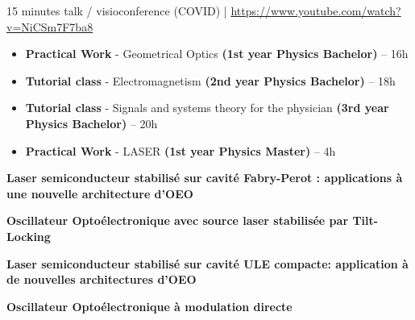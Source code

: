 \documentclass[9pt,a4paper,academicons]{altacv}
\begin{document}
\begin{fullwidth}
\newpage


    
{}

\smallskip

{15 minutes talk / visioconference (COVID)} | {\color{red}\faYoutubePlay}  \href{https://www.youtube.com/watch?v=NiCSm7F7ba8}{https://www.youtube.com/watch?v=NiCSm7F7ba8}





 
\medskip


  \begin{itemize}
    \item \textbf{Practical Work} - Geometrical Optics \textbf{(1st year Physics Bachelor)} -- 16h
    \item \textbf{Tutorial class} - Electromagnetism \textbf{(2nd year Physics Bachelor)} -- 18h
    \item \textbf{Tutorial class} - Signals and systems theory for the physician \textbf{(3rd year Physics Bachelor)} -- 20h
    \item \textbf{Practical Work} - LASER \textbf{(1st year Physics Master)} -- 4h
  \end{itemize}

  \medskip
{}
    
\vspace{-0.5em}\textbf{Laser semiconducteur stabilisé sur cavité Fabry-Perot : applications à une
nouvelle architecture d'OEO}

\divider


\vspace{-0.5em}\textbf{Oscillateur Optoélectronique avec source laser stabilisée par Tilt-Locking}

\divider
    
\vspace{-0.5em}\textbf{Laser semiconducteur stabilisé sur
	cavité ULE compacte: application à
	de nouvelles architectures d’OEO}

\divider

    
\vspace{-0.5em}\textbf{Oscillateur Optoélectronique à modulation directe}


    
    
\end{fullwidth}
\end{document}
